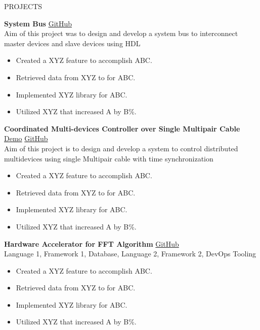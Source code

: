 \documentclass{resume} %
\begin{document}
\begin{rSection}{PROJECTS}
\vspace{-1.25em}
\item \textbf{System Bus}  \hfill \href{https://github.com/SandaruJayawardana/advance-system-bus}{GitHub} \\
{Aim of this project was to design and develop a system bus to interconnect master devices and slave devices using HDL}
\begin{itemize}
    \itemsep -3pt {} 
     \item Created a XYZ feature to accomplish ABC.
     \item Retrieved data from XYZ to for ABC.
    \item Implemented XYZ library for ABC.
    \item Utilized XYZ that increased A by B\%.
 \end{itemize}
\item \textbf{Coordinated Multi-devices Controller over Single Multipair Cable} \hfill \href{www.github.com/GITHUBURL}{Demo} \href{www.github.com/GITHUBURL}{GitHub} \\
{Aim of this project is to design and develop a system to control distributed multidevices using single Multipair cable with time synchronization} 
\begin{itemize}
    \itemsep -3pt {} 
     \item Created a XYZ feature to accomplish ABC.
     \item Retrieved data from XYZ to for ABC.
    \item Implemented XYZ library for ABC.
    \item Utilized XYZ that increased A by B\%.
 \end{itemize}
\item \textbf{Hardware Accelerator for FFT Algorithm} \hfill \href{www.github.com/GITHUBURL}{GitHub} \\
{Language 1, Framework 1, Database, Language 2, Framework 2, DevOps Tooling}
\begin{itemize}
    \itemsep -3pt {} 
     \item Created a XYZ feature to accomplish ABC.
     \item Retrieved data from XYZ to for ABC.
    \item Implemented XYZ library for ABC.
    \item Utilized XYZ that increased A by B\%.
 \end{itemize}
\end{rSection} 
\end{document}
